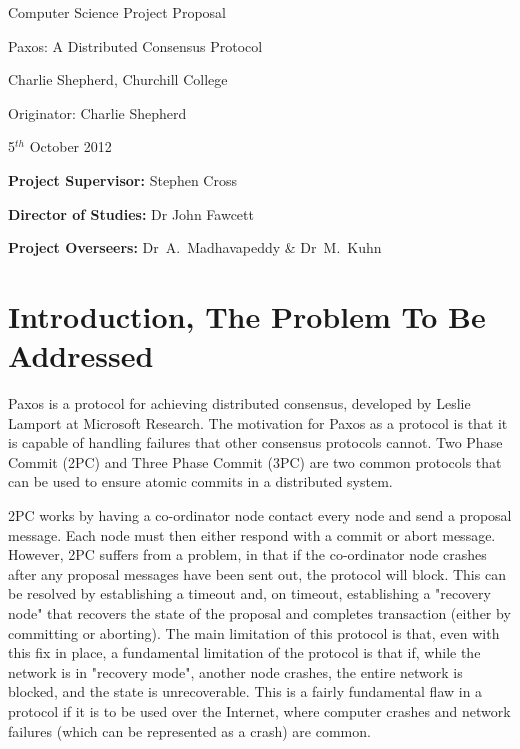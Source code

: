 \vfil

\centerline{\Large Computer Science Project Proposal}
\vspace{0.4in}
\centerline{\Large Paxos: A Distributed Consensus Protocol}
\vspace{0.4in}
\centerline{\large Charlie Shepherd, Churchill College}
\vspace{0.3in}
\centerline{\large Originator: Charlie Shepherd}
\vspace{0.3in}
\centerline{\large 5$^{th}$ October 2012}

\vfil


\noindent
{\bf Project Supervisor:} Stephen Cross
\vspace{0.2in}

\noindent
{\bf Director of Studies:} Dr John Fawcett
\vspace{0.2in}
\noindent

\noindent
{\bf Project Overseers:} Dr~A.~Madhavapeddy \& Dr~M.~Kuhn



\section*{Introduction, The Problem To Be Addressed}

Paxos is a protocol for achieving distributed consensus, developed by Leslie Lamport at
Microsoft Research.
The motivation for Paxos as a protocol is that it is capable of handling failures that other
consensus protocols cannot. Two Phase Commit (2PC) and Three Phase Commit (3PC) are two common
protocols that can be used to ensure atomic commits in a distributed system.

2PC works by having a co-ordinator node contact every node and send a proposal message. Each node
must then either respond with a commit or abort message. However, 2PC suffers from a problem, in
that if the co-ordinator node crashes after any proposal messages have been sent out, the protocol
will block. This can be resolved by establishing a timeout and, on timeout, establishing a
"recovery node" that recovers the state of the proposal and completes transaction (either by
committing or aborting). The main limitation of this protocol is that, even with this fix in
place, a fundamental limitation of the protocol is that if, while the network is in "recovery
mode", another node crashes, the entire network is blocked, and the state is unrecoverable. This
is a fairly fundamental flaw in a protocol if it is to be used over the Internet, where computer
crashes and network failures (which can be represented as a crash) are common.

